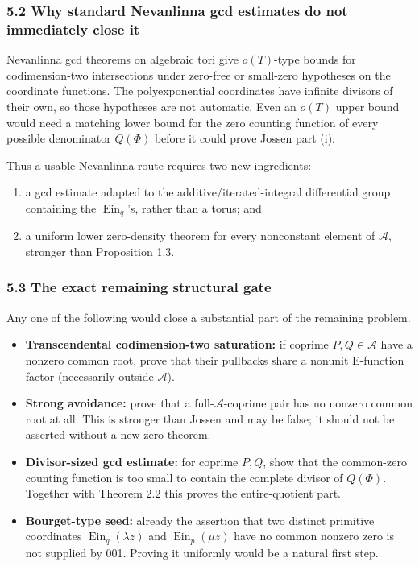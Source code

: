 \subsubsection{5.2 Why standard Nevanlinna gcd estimates do not immediately close it}

Nevanlinna gcd theorems on algebraic tori give
\(o(T)\)-type bounds for codimension-two intersections under zero-free or
small-zero hypotheses on the coordinate functions. The polyexponential
coordinates have infinite divisors of their own, so those hypotheses are not
automatic. Even an \(o(T)\) upper bound would need a matching lower bound for
the zero counting function of every possible denominator \(Q(\Phi)\) before
it could prove Jossen part (i).

Thus a usable Nevanlinna route requires two new ingredients:

\begin{enumerate}
\def\labelenumi{\arabic{enumi}.}
\tightlist
\item
  a gcd estimate adapted to the additive/iterated-integral differential
  group containing the \(\operatorname{Ein}_q\)'s, rather than a torus; and
\item
  a uniform lower zero-density theorem for every nonconstant element of
  \(\mathscr A\), stronger than Proposition 1.3.
\end{enumerate}

\subsubsection{5.3 The exact remaining structural gate}

Any one of the following would close a substantial part of the remaining
problem.

\begin{itemize}
\tightlist
\item
  \textbf{Transcendental codimension-two saturation:} if coprime
  \(P,Q\in\mathscr A\) have a nonzero common root, prove that their pullbacks
  share a nonunit E-function factor (necessarily outside \(\mathscr A\)).
\item
  \textbf{Strong avoidance:} prove that a full-\(\mathscr A\)-coprime pair has no
  nonzero common root at all. This is stronger than Jossen and may be false;
  it should not be asserted without a new zero theorem.
\item
  \textbf{Divisor-sized gcd estimate:} for coprime \(P,Q\), show that the common-zero
  counting function is too small to contain the complete divisor of
  \(Q(\Phi)\). Together with Theorem 2.2 this proves the entire-quotient part.
\item
  \textbf{Bourget-type seed:} already the assertion that two distinct primitive
  coordinates \(\operatorname{Ein}_q(\lambda z)\) and
  \(\operatorname{Ein}_p(\mu z)\) have no common nonzero zero is not supplied
  by 001. Proving it uniformly would be a natural first step.
\end{itemize}

